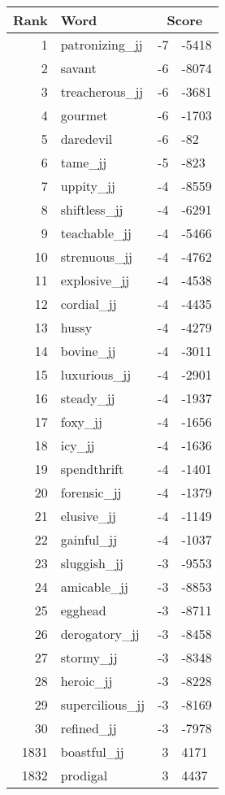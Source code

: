 \begin{longtable}[!htbp]{| rlr@{.}l |}
    \hline
    \textbf{Rank} & \textbf{Word} & \multicolumn{2}{c|}{\textbf{Score}} \\
    \hline
    \endhead
    1 & patronizing\_jj & -7 & -5418 \\
    2 & savant & -6 & -8074 \\
    3 & treacherous\_jj & -6 & -3681 \\
    4 & gourmet & -6 & -1703 \\
    5 & daredevil & -6 & -82 \\
    6 & tame\_jj & -5 & -823 \\
    7 & uppity\_jj & -4 & -8559 \\
    8 & shiftless\_jj & -4 & -6291 \\
    9 & teachable\_jj & -4 & -5466 \\
    10 & strenuous\_jj & -4 & -4762 \\
    11 & explosive\_jj & -4 & -4538 \\
    12 & cordial\_jj & -4 & -4435 \\
    13 & hussy & -4 & -4279 \\
    14 & bovine\_jj & -4 & -3011 \\
    15 & luxurious\_jj & -4 & -2901 \\
    16 & steady\_jj & -4 & -1937 \\
    17 & foxy\_jj & -4 & -1656 \\
    18 & icy\_jj & -4 & -1636 \\
    19 & spendthrift & -4 & -1401 \\
    20 & forensic\_jj & -4 & -1379 \\
    21 & elusive\_jj & -4 & -1149 \\
    22 & gainful\_jj & -4 & -1037 \\
    23 & sluggish\_jj & -3 & -9553 \\
    24 & amicable\_jj & -3 & -8853 \\
    25 & egghead & -3 & -8711 \\
    26 & derogatory\_jj & -3 & -8458 \\
    27 & stormy\_jj & -3 & -8348 \\
    28 & heroic\_jj & -3 & -8228 \\
    29 & supercilious\_jj & -3 & -8169 \\
    30 & refined\_jj & -3 & -7978 \\
    1831 & boastful\_jj & 3 & 4171 \\
    1832 & prodigal & 3 & 4437 \\

\end{longtable}
